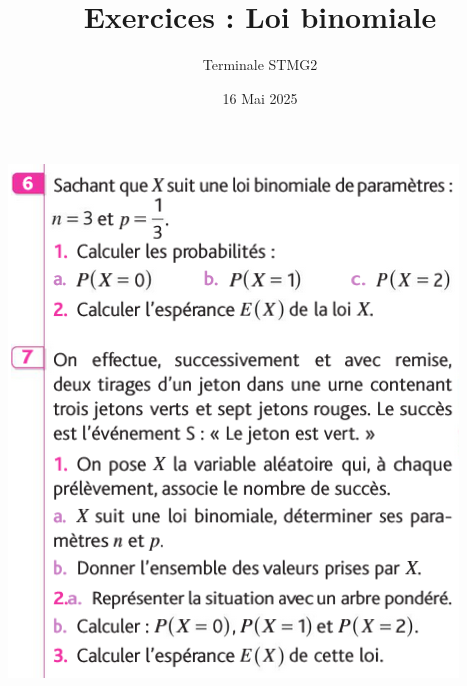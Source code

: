\documentclass{article}
\title{Exercices : Loi binomiale}
\date{16 Mai 2025}
\author{Terminale STMG2}
\begin{document}
\maketitle
\begin{center}
\includegraphics[width=\textwidth]{Exercices.png}

\end{center}
\end{document}
